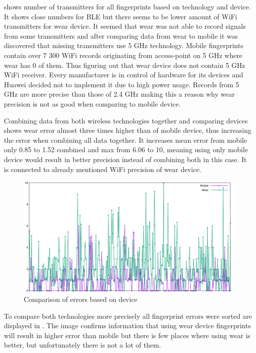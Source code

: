  shows number of transmitters for all fingerprints based on technology and device. It shows close numbers for BLE but there seems to be lower amount of WiFi transmitters for wear device. It seemed that wear was not able to record signals from some transmitters and after comparing data from wear to mobile it was discovered that missing transmitters use 5 GHz technology. Mobile fingerprints contain over 7 300 WiFi records originating from access-point on 5 GHz where wear has 0 of them. Thus figuring out that wear device does not contain 5 GHz WiFi receiver. Every manufacturer is in control of hardware for its devices and Huawei decided not to implement it due to high power usage. Records from 5 GHz are more precise than those of 2.4 GHz making this a reason why wear precision is not as good when comparing to mobile device.

Combining data from both wireless technologies together and comparing devices shows wear error almost three times higher than of mobile device, thus increasing the error when combining all data together. It increases mean error from mobile only 0.85 to 1.52 combined and max from 6.06 to 10, meaning using only mobile device would result in better precision instead of combining both in this case. It is connected to already mentioned WiFi precision of wear device.

\begin{figure}[h!]
	\begin{centering}
		\includegraphics[width=1\textwidth]{img/wknn_errors_mobile_phone}
		\par\end{centering}
	\caption{Comparison of errors based on device}
	\label{fig06c06}
\end{figure}

To compare both technologies more precisely all fingerprint errors were sorted are displayed in . The image confirms information that using wear device fingerprints will result in higher error than mobile but there is few places where using wear is better, but unfortunately there is not a lot of them. 

